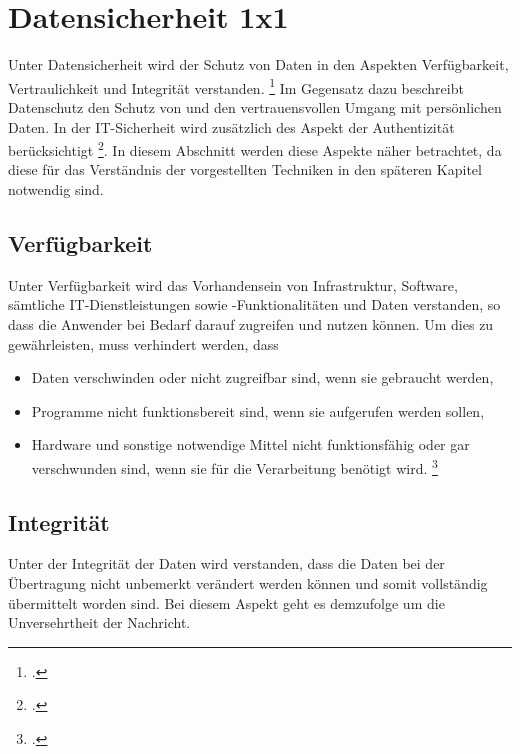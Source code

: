 \chapter{Datensicherheit 1x1}
Unter Datensicherheit wird der Schutz von Daten in den Aspekten Verfügbarkeit, Vertraulichkeit und Integrität verstanden. \footcite{BSI2014} Im Gegensatz dazu beschreibt Datenschutz den Schutz von und den vertrauensvollen Umgang mit persönlichen Daten. In der IT-Sicherheit wird zusätzlich des Aspekt der Authentizität berücksichtigt \footcite{Berliner2014}. In diesem Abschnitt werden diese Aspekte näher betrachtet, da diese für das Verständnis der vorgestellten Techniken in den späteren Kapitel notwendig sind.

\section{Verfügbarkeit}

Unter Verfügbarkeit wird das Vorhandensein von Infrastruktur, Software, sämtliche IT-Dienstleistungen sowie -Funktionalitäten und Daten verstanden, so dass die Anwender bei Bedarf darauf zugreifen und nutzen können. Um dies zu gewährleisten, muss verhindert werden, dass
\begin{itemize}
\item Daten verschwinden oder nicht zugreifbar sind, wenn sie gebraucht werden,
\item Programme nicht funktionsbereit sind, wenn sie aufgerufen werden sollen,
\item Hardware und sonstige notwendige Mittel nicht funktionsfähig oder gar verschwunden sind, wenn sie für die Verarbeitung benötigt wird. \footcite{Berliner2014}
\end{itemize}

\section{Integrität}
Unter der Integrität der Daten wird verstanden, dass die Daten bei der Übertragung nicht unbemerkt verändert werden können und somit vollständig übermittelt worden sind. Bei diesem Aspekt geht es demzufolge um die Unversehrtheit der Nachricht.

